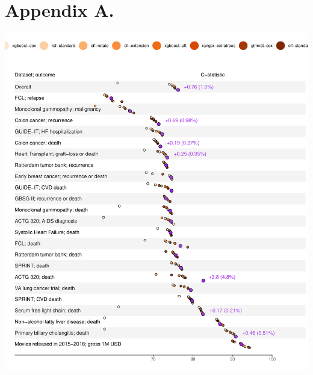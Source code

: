 \documentclass[twoside,11pt]{article}\usepackage[]{graphicx}\usepackage[]{xcolor}
\makeatletter
\def\maxwidth{ %
  \ifdim\Gin@nat@width>\linewidth
    \linewidth
  \else
    \Gin@nat@width
  \fi
}
\newenvironment{knitrout}{}{} %
\makeatother
\begin{document}
\newpage

\appendix
\section*{Appendix A.}

\begin{knitrout}
\color{fgcolor}
\includegraphics[width=\maxwidth]{figure/unnamed-chunk-4-1} 
\end{knitrout}

\newpage
\end{document}
